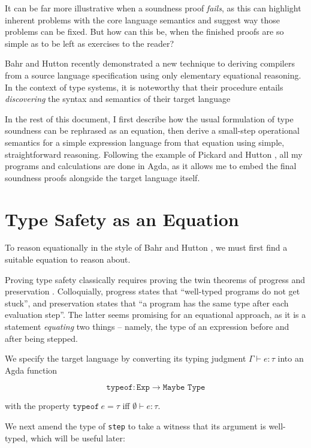 \documentclass[manuscript,screen,review,sigplan]{acmart}
\begin{document}
It can be far more illustrative when a soundness proof \emph{fails}, as this
can highlight inherent problems with the core language semantics and suggest
way those problems can be fixed. But how can this be, when the finished proofs
are so simple as to be left as exercises to the reader?

Bahr and Hutton \cite{bahr:2015} recently demonstrated a new technique to
deriving compilers from a source language specification using only elementary
equational reasoning. In the context of type systems, it is noteworthy that
their procedure entails \emph{discovering} the syntax and semantics of their
target language

In the rest of this document, I first describe how the usual formulation of
type soundness can be rephrased as an equation, then derive a small-step
operational semantics for a simple expression language from that equation using
simple, straightforward reasoning. Following the example of Pickard and Hutton
\cite{pickard:2021}, all my programs and calculations are done in Agda, as it
allows me to embed the final soundness proofs alongside the target language
itself.

\section{Type Safety as an Equation}

To reason equationally in the style of Bahr and Hutton \cite{bahr:2015}, we must
first find a suitable equation to reason about.

Proving type safety classically requires proving the twin theorems of
progress and preservation \cite{harper:pfpl}. Colloquially, progress states
that ``well-typed programs do not get stuck'', and preservation states that
``a program has the same type after each evaluation step''. The latter seems
promising for an equational approach, as it is a statement \emph{equating} two
things -- namely, the type of an expression before and after being stepped.

We specify the target language by converting its typing judgment $\Gamma
\vdash e : \tau$ into an Agda function

\begin{equation}
  \texttt{typeof} : \texttt{Exp} \rightarrow \texttt{Maybe Type}
\end{equation}

with the property $\texttt{typeof}\ e = \tau$ iff $\emptyset \vdash e : \tau$.

We next amend the type of \texttt{step} to take a witness that its argument
is well-typed, which will be useful later:
\end{document}
